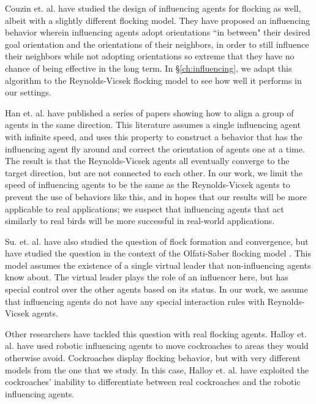 Couzin et. al. \cite{couzin2005} have studied the design of influencing agents
for flocking as well, albeit with a slightly different flocking model.
They have proposed an influencing behavior wherein influencing agents adopt
orientations ``in between" their desired goal orientation and the orientations
of their neighbors, in order to still influence their neighbors while not
adopting orientations so extreme that they have no chance of being effective in
the long term.
In \S\ref{ch:influencing}, we adapt this algorithm to the Reynolds-Vicsek
flocking model to see how well it performs in our settings.

Han et. al. have \cite{han2010teleporting} published a series of papers showing
how to align a group of agents in the same direction.
This literature assumes a single influencing agent with infinite speed, and
uses this property to construct a behavior that has the influencing agent
fly around and correct the orientation of agents one at a time.
The result is that the Reynolds-Vicsek agents all eventually converge to the
target direction, but are not connected to each other.
In our work, we limit the speed of influencing agents to be the same as the
Reynolds-Vicsek agents to prevent the use of behaviors like this, and in hopes
that our results will be more applicable to real applications; we suspect that
influencing agents that act similarly to real birds will be more successful in
real-world applications.

Su. et. al. \cite{su2009virtualleaderinformed} have also studied the question
of flock formation and convergence, but have studied the question in the
context of the Olfati-Saber flocking model
\cite{olfati2006virtualleaderinformed}.
This model assumes the existence of a single virtual leader that
non-influencing agents know about.
The virtual leader plays the role of an influencer here, but has special
control over the other agents based on its status.
In our work, we assume that influencing agents do not have any special
interaction rules with Reynolds-Vicsek agents.

Other researchers have tackled this question with real flocking agents.
Halloy et. al. \cite{Halloy2007} have used robotic influencing agents to move
cockroaches to areas they would otherwise avoid.
Cockroaches display flocking behavior, but with very different models from the
one that we study.
In this case, Halloy et. al. have exploited the cockroaches' inability to
differentiate between real cockroaches and the robotic influencing agents.


